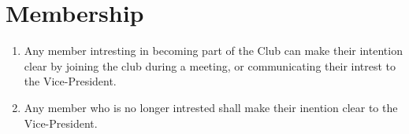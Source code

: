 \documentclass[a4paper,12pt]{article}
\begin{document}
\section{Membership}
\begin{enumerate}[label=\thesection.\arabic*.]
  \item Any member intresting in becoming part of the Club can make their intention clear by joining the club during a meeting, or communicating their intrest to the Vice-President.
  \item Any member who is no longer intrested shall make their inention clear to the Vice-President.
\end{enumerate}
\end{document}
